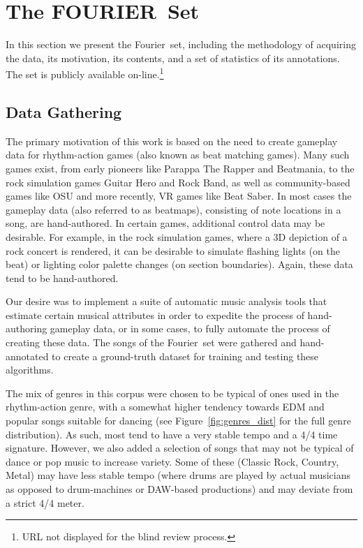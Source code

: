 \documentclass{article}
\newcommand{\setNameUpper}{FOURIER}
\newcommand{\setName}{Fourier}
\begin{document}
\section{The \setNameUpper~Set}\label{sec:dataset}

In this section we present the \setName~set, including the methodology of acquiring the data, its motivation, its contents, and a set of statistics of its annotations.
The set is publicly available on-line.\footnote{URL not displayed for the blind review process.}

\subsection{Data Gathering}

The primary motivation of this work is based on the need to create gameplay data for rhythm-action games (also known as beat matching games). Many such games exist, from early pioneers like Parappa The Rapper and Beatmania, to the rock simulation games Guitar Hero and Rock Band, as well as community-based games like OSU and more recently, VR games like Beat Saber. In most cases the gameplay data (also referred to as beatmaps), consisting of note locations in a song, are hand-authored. In certain games, additional control data may be desirable. For example, in the rock simulation games, where a 3D depiction of a rock concert is rendered, it can be desirable to simulate flashing lights (on the beat) or lighting color palette changes (on section boundaries). Again, these data tend to be hand-authored.

Our desire was to implement a suite of automatic music analysis tools that estimate certain musical attributes in order to expedite the process of hand-authoring gameplay data, or in some cases, to fully automate the process of creating these data. The songs of the \setName~set were gathered and hand-annotated to create a ground-truth dataset for training and testing these algorithms.

The mix of genres in this corpus were chosen to be typical of ones used in the rhythm-action genre, with a somewhat higher tendency towards EDM and popular songs suitable for dancing (see Figure~\ref{fig:genres_dist} for the full genre distribution).
As such, most tend to have a very stable tempo and a 4/4 time signature. 
However, we also added a selection of songs that may not be typical of dance or pop music to increase variety.
Some of these (Classic Rock, Country, Metal) may have less stable tempo (where drums are played by actual musicians as opposed to drum-machines or DAW-based productions) and may deviate from a strict 4/4 meter. 
\end{document}
